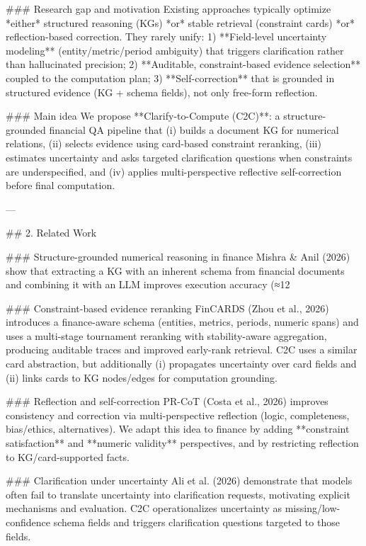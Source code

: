 ### Research gap and motivation  
Existing approaches typically optimize *either* structured reasoning (KGs) *or* stable retrieval (constraint cards) *or* reflection-based correction. They rarely unify:  
1) **Field-level uncertainty modeling** (entity/metric/period ambiguity) that triggers clarification rather than hallucinated precision;  
2) **Auditable, constraint-based evidence selection** coupled to the computation plan;  
3) **Self-correction** that is grounded in structured evidence (KG + schema fields), not only free-form reflection.

### Main idea  
We propose **Clarify-to-Compute (C2C)**: a structure-grounded financial QA pipeline that (i) builds a document KG for numerical relations, (ii) selects evidence using card-based constraint reranking, (iii) estimates uncertainty and asks targeted clarification questions when constraints are underspecified, and (iv) applies multi-perspective reflective self-correction before final computation.

---

## 2. Related Work  

### Structure-grounded numerical reasoning in finance  
Mishra & Anil (2026) show that extracting a KG with an inherent schema from financial documents and combining it with an LLM improves execution accuracy (≈12%

### Constraint-based evidence reranking  
FinCARDS (Zhou et al., 2026) introduces a finance-aware schema (entities, metrics, periods, numeric spans) and uses a multi-stage tournament reranking with stability-aware aggregation, producing auditable traces and improved early-rank retrieval. C2C uses a similar card abstraction, but additionally (i) propagates uncertainty over card fields and (ii) links cards to KG nodes/edges for computation grounding.

### Reflection and self-correction  
PR-CoT (Costa et al., 2026) improves consistency and correction via multi-perspective reflection (logic, completeness, bias/ethics, alternatives). We adapt this idea to finance by adding **constraint satisfaction** and **numeric validity** perspectives, and by restricting reflection to KG/card-supported facts.

### Clarification under uncertainty  
Ali et al. (2026) demonstrate that models often fail to translate uncertainty into clarification requests, motivating explicit mechanisms and evaluation. C2C operationalizes uncertainty as missing/low-confidence schema fields and triggers clarification questions targeted to those fields.

